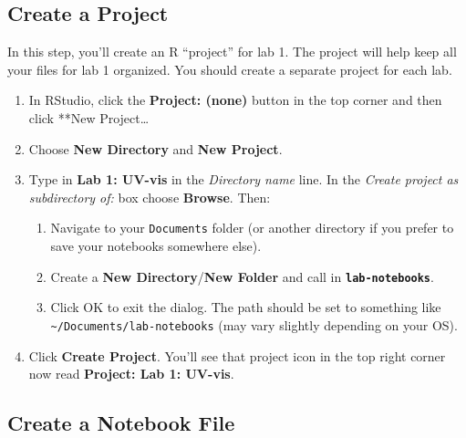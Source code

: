 \documentclass[]{tufte-book}
\providecommand{\tightlist}{%
  \setlength{\itemsep}{0pt}\setlength{\parskip}{0pt}}
\begin{document}
\hypertarget{create-a-project}{%
\subsection{Create a Project}\label{create-a-project}}

In this step, you'll create an R ``project'' for lab 1. The project will help keep all your files for lab 1 organized. You should create a separate project for each lab.

\begin{enumerate}
\def\labelenumi{\arabic{enumi}.}
\tightlist
\item
  In RStudio, click the \textbf{Project: (none)} button in the top corner and then click **New Project\ldots*
\item
  Choose \textbf{New Directory} and \textbf{New Project}.
\item
  Type in \textbf{Lab 1: UV-vis} in the \emph{Directory name} line. In the \emph{Create project as subdirectory of:} box choose \textbf{Browse}. Then:

  \begin{enumerate}
  \def\labelenumii{\arabic{enumii}.}
  \tightlist
  \item
    Navigate to your \texttt{Documents} folder (or another directory if you prefer to save your notebooks somewhere else).
  \item
    Create a \textbf{New Directory}/\textbf{New Folder} and call in \textbf{\texttt{lab-notebooks}}.
  \item
    Click OK to exit the dialog. The path should be set to something like \texttt{\textasciitilde{}/Documents/lab-notebooks} (may vary slightly depending on your OS).
  \end{enumerate}
\item
  Click \textbf{Create Project}. You'll see that project icon in the top right corner now read \textbf{Project: Lab 1: UV-vis}.
\end{enumerate}

\hypertarget{create-a-notebook-file}{%
\subsection{Create a Notebook File}\label{create-a-notebook-file}}
\end{document}
